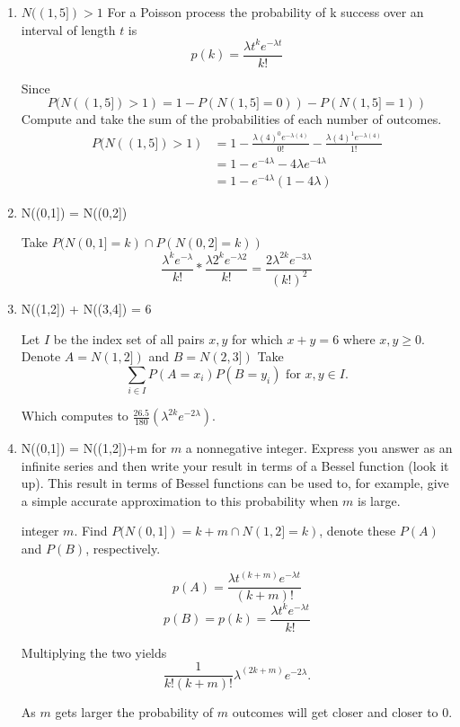 \documentclass{tufte-book}
\theoremstyle{mytheoremstyle}
\theoremstyle{mylemstyle}
\theoremstyle{mydefstyle}
\begin{document}
\begin{enumerate}
\item $N((1,5])>1$
For a Poisson process the probability of k success over an interval of length $t$ is
\[p(k) = \frac{\lambda t^ke^{-\lambda t}}{k!} \]

Since
\[ P(N((1,5])>1) = 1 - P(N(1,5]=0)) - P(N(1,5]=1)) \]
Compute and take the sum of the probabilities of each number of outcomes.
\begin{align*}
P(N((1,5])>1) &= 1 - \frac{\lambda(4)^0e^{-\lambda(4)}}{0!} - \frac{\lambda(4)^{1}e^{-\lambda(4)}}{1!}\\
&= 1 - e^{-4\lambda} - 4\lambda e^{-4\lambda}\\
&= 1- e^{-4\lambda}(1- 4\lambda)
\end{align*}

\item N((0,1]) = N((0,2])

Take $P(N(0,1]=k) \cap P(N(0,2]=k))$
\[\frac{\lambda^ke^{-\lambda}}{k!} * \frac{\lambda 2^ke^{-\lambda 2}}{k!} =
\frac{2\lambda^{2k}e^{-3\lambda}}{(k!)^2} \]

\item N((1,2]) + N((3,4]) = 6

Let $I$ be the index set of all pairs $x,y$ for which $x+y=6$ where $x,y \geq 0$.  Denote $A=N(1,2])$ and $B=N(2,3])$  Take
\[\sum_{i\in I}P(A=x_i)P(B=y_i) \text{ for } x,y \in I.\]

Which computes to $\frac{26.5}{180}(\lambda^{2k}e^{-2\lambda})$.

\item N((0,1]) = N((1,2])+m for $m$ a nonnegative integer. Express you answer as an infinite series and then write your result in terms of a Bessel function (look it up).  This result in terms of Bessel functions can be used to, for example, give a simple accurate approximation to this probability when $m$ is large.

 integer $m$.  Find $P(N(0,1])=k+m \cap N(1,2]=k)$, denote these $P(A)$ and $P(B)$, respectively.

\[ p(A) = \frac{\lambda t^{(k+m)}e^{-\lambda t}}{(k+m)!} \]
\[ p(B) = p(k) = \frac{\lambda t^ke^{-\lambda t}}{k!} \]

Multiplying the two yields
\[ \frac{1}{k!(k+m)!}\lambda^{(2k+m)}e^{-2\lambda}. \]

As $m$ gets larger the probability of $m$ outcomes will get closer and closer to $0$.
\end{enumerate}
\end{document}
